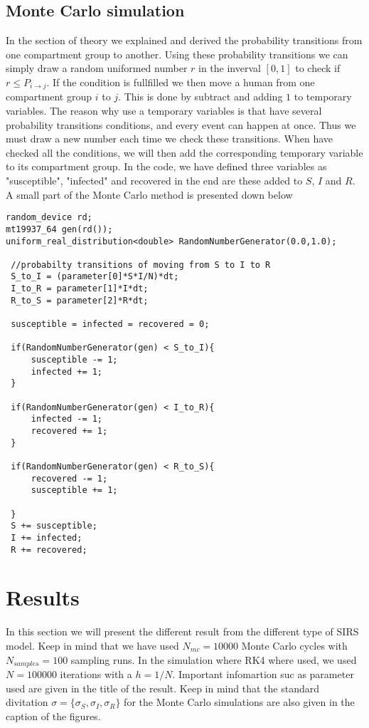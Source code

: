 \documentclass[a4paper, 10pt]{article}
\begin{document}
\subsection{Monte Carlo simulation}\label{MC method} In the section of theory we explained and derived
the probability transitions from one compartment group to another. Using these probability transitions we can simply draw a
random uniformed number $r$ in the inverval $[0,1]$ to check if $r \le P_{i\to j}$. If the condition is fullfilled
we then move a human from one compartment group $i$ to $j$. This is done by subtract and adding $1$ to temporary
variables. The reason why use a temporary variables is that have several probability transitions conditions, and
every event can happen at once. Thus we must draw a new number each time we check these transitions. When have checked all the conditions,
we will then add the corresponding temporary variable to its compartment group. In the code, we have defined
three variables as "susceptible", "infected" and recovered in the end are these added to $S$, $I$ and $R$.
A small part of the Monte Carlo method is presented down below
\begin{lstlisting}
random_device rd;
mt19937_64 gen(rd());
uniform_real_distribution<double> RandomNumberGenerator(0.0,1.0);

 //probabilty transitions of moving from S to I to R
 S_to_I = (parameter[0]*S*I/N)*dt;
 I_to_R = parameter[1]*I*dt;
 R_to_S = parameter[2]*R*dt;

 susceptible = infected = recovered = 0;

 if(RandomNumberGenerator(gen) < S_to_I){
     susceptible -= 1;
     infected += 1;
 }

 if(RandomNumberGenerator(gen) < I_to_R){
     infected -= 1;
     recovered += 1;
 }

 if(RandomNumberGenerator(gen) < R_to_S){
     recovered -= 1;
     susceptible += 1;

 }
 S += susceptible;
 I += infected;
 R += recovered;
\end{lstlisting}

\section{Results}
In this section we will present the different result from the different type of SIRS
model. Keep in mind that we have used $N_{mc} = 10000$ Monte Carlo cycles with $N_{samples} = 100$ sampling runs.
In the simulation where RK4 where used, we used $N = 100000$ iterations with a $h = 1/N$. Important infomartion suc as parameter
used are given in the title of the result. Keep in mind that the standard divitation
$\sigma = \{\sigma_{S},\sigma_{I},\sigma_{R}\}$ for the Monte Carlo simulations are also given in the caption of the figures.
\end{document}
